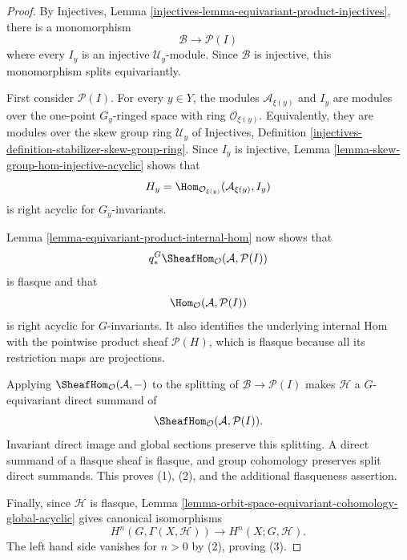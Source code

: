 \begin{proof}
By Injectives, Lemma
\ref{injectives-lemma-equivariant-product-injectives}, there is a
monomorphism
$$
\mathcal B\longrightarrow\mathcal P(I)
$$
where every $I_y$ is an injective $\mathcal U_y$-module. Since
$\mathcal B$ is injective, this monomorphism splits equivariantly.

First consider $\mathcal P(I)$. For every $y\in Y$, the modules
$\mathcal A_{\xi(y)}$ and $I_y$ are modules over the one-point
$G_y$-ringed space with ring $\mathcal O_{\xi(y)}$. Equivalently, they
are modules over the skew group ring $\mathcal U_y$ of Injectives,
Definition \ref{injectives-definition-stabilizer-skew-group-ring}. Since
$I_y$ is injective, Lemma
\ref{lemma-skew-group-hom-injective-acyclic} shows that
$$
H_y=
\Hom_{\mathcal O_{\xi(y)}}(\mathcal A_{\xi(y)},I_y)
$$
is right acyclic for $G_y$-invariants.

Lemma \ref{lemma-equivariant-product-internal-hom} now shows that
$$
q_*^G\SheafHom_{\mathcal O}(\mathcal A,\mathcal P(I))
$$
is flasque and that
$$
\Hom_{\mathcal O}(\mathcal A,\mathcal P(I))
$$
is right acyclic for $G$-invariants. It also identifies the underlying
internal Hom with the pointwise product sheaf $\mathcal P(H)$, which is
flasque because all its restriction maps are projections.

Applying $\SheafHom_{\mathcal O}(\mathcal A,-)$ to the splitting of
$\mathcal B\to\mathcal P(I)$ makes $\mathcal H$ a $G$-equivariant direct
summand of
$$
\SheafHom_{\mathcal O}(\mathcal A,\mathcal P(I)).
$$
Invariant direct image and global sections preserve this splitting. A
direct summand of a flasque sheaf is flasque, and group cohomology
preserves split direct summands. This proves (1), (2), and the additional
flasqueness assertion.

Finally, since $\mathcal H$ is flasque, Lemma
\ref{lemma-orbit-space-equivariant-cohomology-global-acyclic} gives
canonical isomorphisms
$$
H^n(G,\Gamma(X,\mathcal H))
\longrightarrow
H^n(X;G,\mathcal H).
$$
The left hand side vanishes for $n>0$ by (2), proving (3).
\end{proof}


